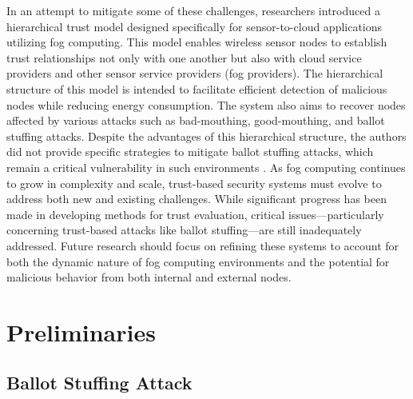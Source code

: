 \documentclass{sn-jnl}%
\begin{document}
In an attempt to mitigate some of these challenges, researchers introduced a hierarchical trust model designed specifically for sensor-to-cloud applications utilizing fog computing. This model enables wireless sensor nodes to establish trust relationships not only with one another but also with cloud service providers and other sensor service providers (fog providers). The hierarchical structure of this model is intended to facilitate efficient detection of malicious nodes while reducing energy consumption. The system also aims to recover nodes affected by various attacks such as bad-mouthing, good-mouthing, and ballot stuffing attacks. Despite the advantages of this hierarchical structure, the authors did not provide specific strategies to mitigate ballot stuffing attacks, which remain a critical vulnerability in such environments \cite{wang2020novel}.
As fog computing continues to grow in complexity and scale, trust-based security systems must evolve to address both new and existing challenges. While significant progress has been made in developing methods for trust evaluation, critical issues—particularly concerning trust-based attacks like ballot stuffing—are still inadequately addressed. Future research should focus on refining these systems to account for both the dynamic nature of fog computing environments and the potential for malicious behavior from both internal and external nodes.
\section{Preliminaries}
\subsection{Ballot Stuffing Attack}
\end{document}
